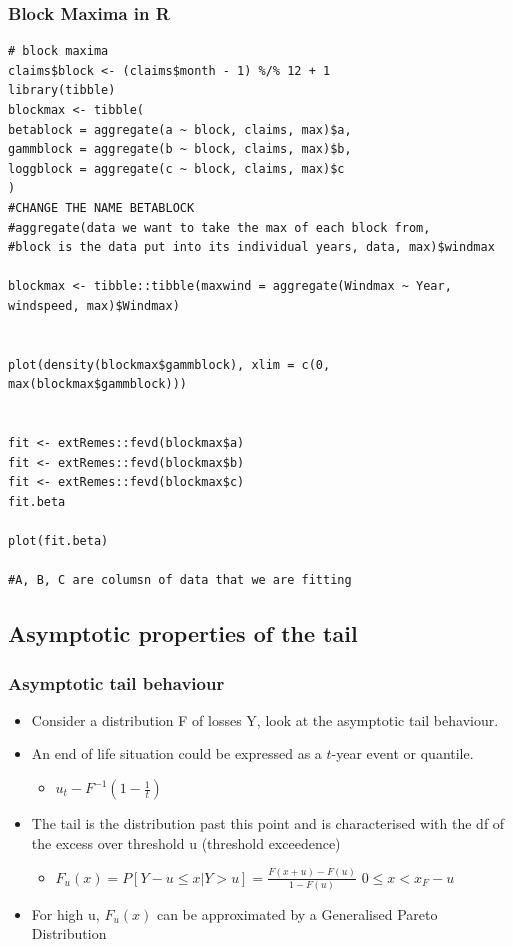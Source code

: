 \documentclass{article}
\begin{document}
\subsubsection{Block Maxima in R}
\begin{lstlisting}
# block maxima
claims$block <- (claims$month - 1) %/% 12 + 1
library(tibble)
blockmax <- tibble(
betablock = aggregate(a ~ block, claims, max)$a,
gammblock = aggregate(b ~ block, claims, max)$b,
loggblock = aggregate(c ~ block, claims, max)$c
)
#CHANGE THE NAME BETABLOCK
#aggregate(data we want to take the max of each block from, 
#block is the data put into its individual years, data, max)$windmax

blockmax <- tibble::tibble(maxwind = aggregate(Windmax ~ Year, windspeed, max)$Windmax)


plot(density(blockmax$gammblock), xlim = c(0, max(blockmax$gammblock)))


fit <- extRemes::fevd(blockmax$a)
fit <- extRemes::fevd(blockmax$b)
fit <- extRemes::fevd(blockmax$c)
fit.beta

plot(fit.beta)

#A, B, C are columsn of data that we are fitting
\end{lstlisting}




\subsection{Asymptotic properties of the tail}

\subsubsection{Asymptotic tail behaviour}

\begin{itemize}
   \item Consider a distribution F of losses Y, look at the asymptotic tail behaviour.
   \item An end of life situation could be expressed as a $t$-year event or quantile.
   \begin{itemize}
       \item $u_t - F^{-1} (1 - \frac{1}{t})$
   \end{itemize}
   \item The tail is the distribution past this point and is characterised with the df of the excess over threshold u (threshold exceedence)
   \begin{itemize}
       \item $F_u(x) = P[Y - u \leq x | Y > u] = \frac{F(x+u) - F(u)}{1 - F(u)}$ \hspace{1cm} $0 \leq x < x_F - u$
   \end{itemize}
   \item For high u, $F_u(x)$ can be approximated by a Generalised Pareto Distribution
\end{itemize}
\end{document}
